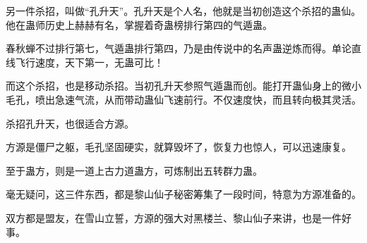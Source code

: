 \begin{this_body}
另一件杀招，叫做“孔升天”。孔升天是个人名，他就是当初创造这个杀招的蛊仙。他在蛊师历史上赫赫有名，掌握着奇蛊榜排行第四的气遁蛊。

春秋蝉不过排行第七，气遁蛊排行第四，乃是由传说中的名声蛊逆炼而得。单论直线飞行速度，天下第一，无蛊可比！

而这个杀招，也是移动杀招。当初孔升天参照气遁蛊而创。能打开蛊仙身上的微小毛孔，喷出急速气流，从而带动蛊仙飞速前行。不仅速度快，而且转向极其灵活。

杀招孔升天，也很适合方源。

方源是僵尸之躯，毛孔坚固硬实，就算毁坏了，恢复力也惊人，可以迅速康复。

至于蛊方，则是一道上古力道蛊方，可炼制出五转群力蛊。

毫无疑问，这三件东西，都是黎山仙子秘密筹集了一段时间，特意为方源准备的。

双方都是盟友，在雪山立誓，方源的强大对黑楼兰、黎山仙子来讲，也是一件好事。

\end{this_body}


